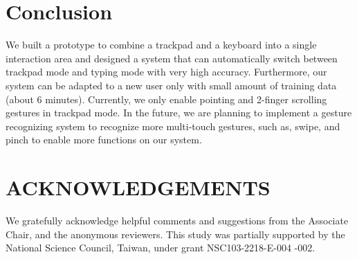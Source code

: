 \section{Conclusion}

We built a prototype to combine a trackpad and a keyboard into a single interaction area and designed a system that can automatically switch between trackpad mode and typing mode with very high accuracy. Furthermore, our system can be adapted to a new user only with small amount of training data (about 6 minutes). 
Currently, we only enable pointing and 2-finger scrolling gestures in trackpad mode. In the future, we are planning to implement a gesture recognizing system to recognize more multi-touch gestures, such as, swipe, and pinch to enable more functions on our system.

\section{ACKNOWLEDGEMENTS}
We gratefully acknowledge helpful comments and suggestions from the Associate Chair, and the anonymous reviewers. This study was partially supported by the National Science Council, Taiwan, under grant NSC103-2218-E-004 -002.






